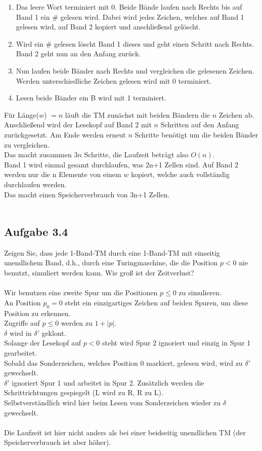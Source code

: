 \begin{enumerate}
	\item Das leere Wort terminiert mit 0. Beide Bände laufen nach Rechts bis auf Band 1 ein $\#$ gelesen wird. Dabei wird jedes Zeichen, welches auf Band 1 gelesen wird, auf Band 2 kopiert und anschließend gelöscht.
	\item Wird ein $\#$ gelesen löscht Band 1 dieses und geht einen Schritt nach Rechts.
	Band 2 geht nun an den Anfang zurück.
	\item Nun laufen beide Bänder nach Rechts und vergleichen die gelesenen Zeichen. Werden unterschiedliche Zeichen gelesen wird mit 0 terminiert.
	\item Lesen beide Bänder ein B wird mit 1 terminiert.
\end{enumerate}
Für Länge($w$) $=n$ läuft die TM zunächst mit beiden Bändern die $n$ Zeichen ab. Anschließend wird der Lesekopf auf Band 2 mit $n$ Schritten auf den Anfang zurückgesetzt. Am Ende werden erneut $n$ Schritte benötigt um die beiden Bänder zu vergleichen.\\
Das macht zusammen $3n$ Schritte, die Laufzeit beträgt also $O(n)$.\\
Band 1 wird einmal gesamt durchlaufen, was 2n+1 Zellen sind. Auf Band 2 werden nur die n Elemente von einem $w$ kopiert, welche auch vollständig durchlaufen werden.\\
Das macht einen Speicherverbrauch von 3n+1 Zellen.\\\\



\subsection*{Aufgabe 3.4}
Zeigen Sie, dass jede 1-Band-TM durch eine 1-Band-TM mit einseitig unendlichem Band, d.h., durch eine Turingmaschine, die die Position $p < 0$ nie benutzt, simuliert werden kann. Wie groß ist der Zeitverlust?\\\\

Wir benutzen eine zweite Spur um  die Positionen $p \leq 0$ zu simulieren.\\
An Position $p_0 = 0$ steht ein einzigartiges Zeichen auf beiden Spuren, um diese Position zu erkennen.\\
Zugriffe auf $p \leq 0$ werden zu $1+ \left| p \right|$.\\
$\delta$ wird in $\delta'$ geklont.\\
Solange der Lesekopf auf $p < 0$ steht wird Spur 2 ignoriert und einzig in Spur 1 gearbeitet.\\
Sobald das Sonderzeichen, welches Position 0 markiert, gelesen wird, wird zu $\delta'$ gewechselt.\\
$\delta'$ ignoriert Spur 1 und arbeitet in Spur 2. Zusätzlich werden die Schrittrichtungen gespiegelt (L wird zu R, R zu L).\\
Selbstverständlich wird hier beim Lesen vom Sonderzeichen wieder zu $\delta$ gewechselt.\\\\

Die Laufzeit ist hier nicht anders als bei einer beidseitig unendlichen TM (der Speicherverbrauch ist aber höher).